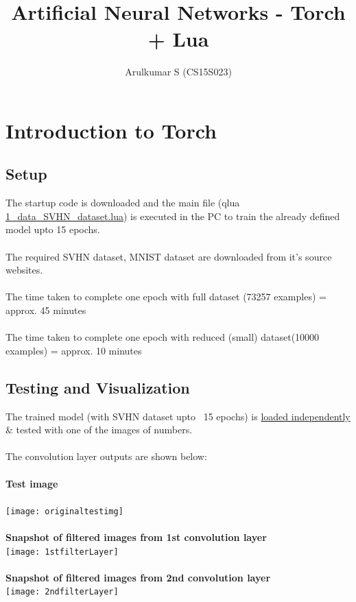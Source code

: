 \documentclass{article}
\begin{document}
 
	\title{Artificial Neural Networks - Torch + Lua}
	\author{Arulkumar S (CS15S023)}
	\maketitle 

	\section{Introduction to Torch}
	
	\subsection{Setup}
	The startup code\cite{stmt} is downloaded and the main file (qlua
	\href{./SVHN_training/1_data_SVHN_dataset.lua}{1\_data\_SVHN\_dataset.lua}) is
	executed in the PC to train the already defined model upto 15 epochs. \\\\
	The required SVHN dataset\cite{svhn}, MNIST dataset\cite{mnist} are
	downloaded from it's source websites.\\\\ The time taken to complete one epoch with full dataset (73257
	examples) = approx. 45 minutes \\\\
    The time taken to complete one epoch with reduced (small) dataset(10000
	examples) = approx. 10 minutes
	
	\subsection{Testing and Visualization}
	
	The trained model (with SVHN dataset upto ~15 epochs) is
	\href{./testing_visualization/testTheModel.lua}{loaded independently} \& tested
	with one of the images of numbers. \\\\ The convolution layer outputs are shown
	below:\\\\
    \textbf{Test image}\\\\
    \texttt{[image: originaltestimg]}\\\\
	\textbf{Snapshot of filtered images from 1st convolution layer}\\
	\texttt{[image: 1stfilterLayer]}\\\\
    \textbf{Snapshot of filtered images from 2nd convolution layer}\\
    \texttt{[image: 2ndfilterLayer]}
       
\end{document}

